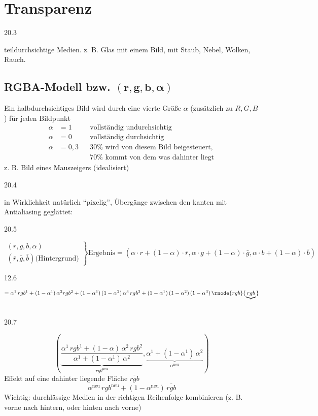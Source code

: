 \chapter{Transparenz}
\begin{center}
 20.3
\end{center}
teildurchsichtige Medien. z. B. Glas mit einem Bild, mit Staub, Nebel, Wolken, Rauch.

\section{RGBA-Modell bzw. $\boldsymbol{(r, g, b, \alpha)}$}
Ein halbdurchsichtiges Bild wird durch eine vierte Größe $\alpha$ (zusätzlich zu $R, G, B$) für jeden Bildpunkt
\begin{align*}
 \alpha &= 1 & &\text{vollständig undurchsichtig}\\
 \alpha &= 0 & &\text{vollständig durchsichtig}\\
 \alpha &= 0{,3} & &\text{$30\%$ wird von diesem Bild beigesteuert, }\\
	&	& &\text{$70\%$ kommt von dem was dahinter liegt}
\end{align*}
z. B. Bild eines Mauszeigers (idealisiert)
\begin{center}
 20.4
\end{center}
in Wirklichkeit natürlich "`pixelig"', Übergänge zwischen den kanten mit Antialiasing geglättet:
\begin{center}
 20.5
\end{center}
\[
\left.
 \begin{array}{r}
  (r,g,b,\alpha)\\
 (\bar r, \bar g, \bar b) \text{(Hintergrund)}
  \end{array}\right\} \text{Ergebnis} = (\alpha \cdot r + (1 - \alpha)\cdot \bar r,
					\alpha \cdot g + (1 - \alpha)\cdot \bar g,
					\alpha \cdot b + (1 - \alpha)\cdot \bar b)
\]
\begin{center}
 12.6
\end{center}
 $= \alpha^1\,rgb^1 + (1 - \alpha^1)\,\alpha^2rgb^2 + (1-\alpha^1)\,(1-\alpha^2)\,\alpha^3\,rgb^3
	+ (1-\alpha^1)\,(1-\alpha^2)\,(1-\alpha^3)\,\rnode{rgb}{\underbrace{rgb}}$
	\begin{center}
	  \hspace{5cm} \\[1em]
	 20.7
	\end{center}
	\[\left(\underbrace{\frac{\alpha^1\,rgb^1 + (1 - \alpha)\,\alpha^2\,rgb^2}{\alpha^1 + (1-\alpha^1)\,\alpha^2}}_
		{rgb^\mathrm{neu}}, \underbrace{\alpha^1 + (1-\alpha^1)\,\alpha^2}_{\alpha^\mathrm{neu}}\right)\]
		Effekt auf eine dahinter liegende Fläche $\overline{rgb}$
		\[\alpha^\mathrm{neu} \, rgb^\mathrm{neu} + (1-\alpha^\mathrm{neu})\,\overline{rgb}\]
Wichtig: durchlässige Medien in der richtigen Reihenfolge kombinieren (z. B. vorne nach hintern, oder hinten nach vorne)

